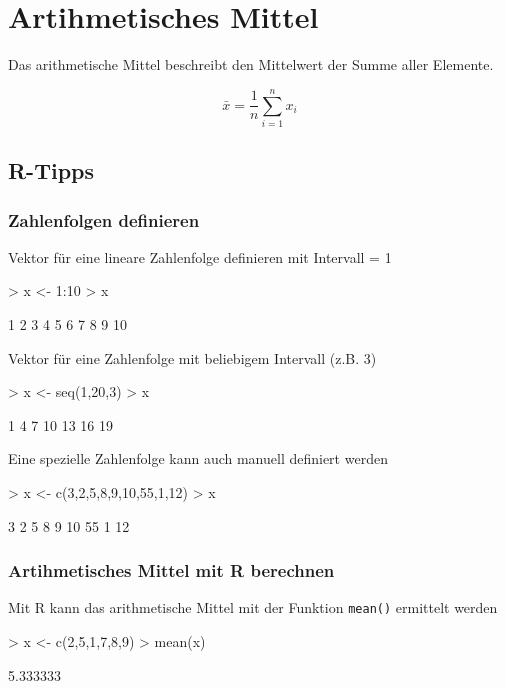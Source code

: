 \section{Artihmetisches Mittel}
Das arithmetische Mittel beschreibt den Mittelwert der Summe aller Elemente.

\[ \bar{x} = \frac{1}{n} \sum\limits_{i=1}^{n} x_i \]

\subsection{R-Tipps}
\subsubsection{Zahlenfolgen definieren}
Vektor für eine lineare Zahlenfolge definieren mit Intervall = 1
\begin{Schunk}
\begin{Sinput}
> x <- 1:10
> x
\end{Sinput}
\begin{Soutput}
 [1]  1  2  3  4  5  6  7  8  9 10
\end{Soutput}
\end{Schunk}
Vektor für eine Zahlenfolge mit beliebigem Intervall (z.B. 3)
\begin{Schunk}
\begin{Sinput}
> x <- seq(1,20,3)
> x
\end{Sinput}
\begin{Soutput}
[1]  1  4  7 10 13 16 19
\end{Soutput}
\end{Schunk}
Eine spezielle Zahlenfolge kann auch manuell definiert werden
\begin{Schunk}
\begin{Sinput}
> x <- c(3,2,5,8,9,10,55,1,12)
> x
\end{Sinput}
\begin{Soutput}
[1]  3  2  5  8  9 10 55  1 12
\end{Soutput}
\end{Schunk}
\subsubsection{Artihmetisches Mittel mit R berechnen}
Mit R kann das arithmetische Mittel mit der Funktion \verb!mean()! 
ermittelt werden
\begin{Schunk}
\begin{Sinput}
> x <- c(2,5,1,7,8,9)
> mean(x)
\end{Sinput}
\begin{Soutput}
[1] 5.333333
\end{Soutput}
\end{Schunk}

